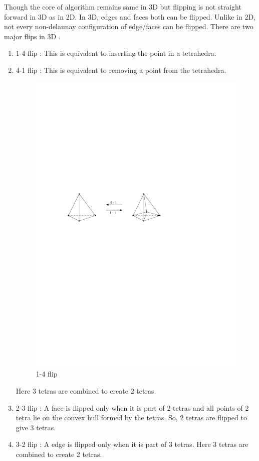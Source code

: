 Though the core of algorithm remains same in 3D but flipping is not straight forward in 3D as in 2D. In 3D, edges and faces both can be flipped. Unlike in 2D, not every non-delaunay configuration of edge/faces  can be flipped. There are two major flips in 3D \cite{joe}. 
\begin{enumerate}
	\item 1-4 flip : This is equivalent to inserting the point in a tetrahedra.
	\item 4-1 flip : This is equivalent to removing a point from the tetrahedra.

\begin{figure}[ht]
    \centering
    \includegraphics{images/1-4.pdf}
    \caption{1-4 flip}
    \label{fig:1_4_flip}
\end{figure}

Here 3 tetras are combined to create 2 tetras.
	\item 2-3 flip : A face is flipped only when it is part of 2 tetras and all points of 2 tetra lie on the convex hull formed by the tetras. So, 2 tetras are flipped to give 3 tetras.
	\item 3-2 flip : A edge is flipped only when it is part of 3 tetras.
Here 3 tetras are combined to create 2 tetras.


\end{enumerate}

